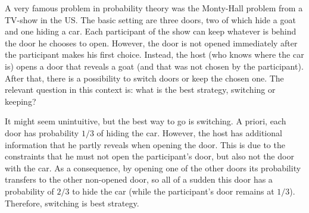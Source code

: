 \begin{ex}
A very famous problem in probability theory was the Monty-Hall problem from a TV-show in the US. The basic setting are three doors, two of which hide a goat and one hiding a car. Each participant of the show can keep whatever is behind the door he chooses to open. However, the door is not opened immediately after the participant makes his first choice. Instead, the host (who knows where the car is) opens a door that reveals a goat (and that was not chosen by the participant). After that, there is a possibility to switch doors or keep the chosen one. The relevant question in this context is: what is the best strategy, switching or keeping?


It might seem unintuitive, but the best way to go is switching. A priori, each door has probability $1 / 3$ of hiding the car. However, the host has additional information that he partly reveals when opening the door. This is due to the constraints that he must not open the participant's door, but also not the door with the car. As a consequence, by opening one of the other doors its probability transfers to the other non-opened door, so all of a sudden this door has a probability of $2 / 3$ to hide the car (while the participant's door remains at $1 / 3$). Therefore, switching is best strategy.


\end{ex}
